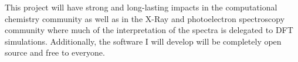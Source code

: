 \documentclass[notitlepage,12pt]{report}
\begin{document}
This project will have strong and long-lasting impacts in the computational chemistry community as well as in the X-Ray and photoelectron spectroscopy community where much of the interpretation of the spectra is delegated to DFT simulations. Additionally, the software I will develop will be completely open source and free to everyone.
\end{document}

